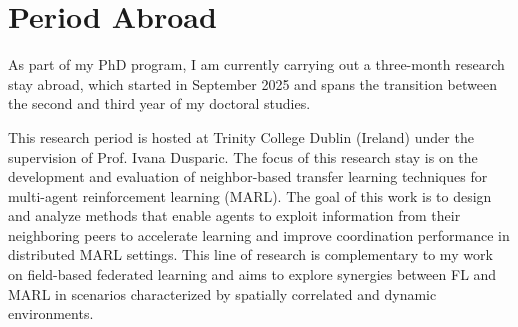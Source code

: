 \documentclass[runningheads]{llncs}
\begin{document}




\section{Period Abroad}
As part of my PhD program, I am currently carrying out a three-month research stay abroad, 
 which started in September 2025 and spans the transition between 
 the second and third year of my doctoral studies.

This research period is hosted at Trinity College Dublin (Ireland) 
 under the supervision of Prof. Ivana Dusparic. 
% 
The focus of this research stay is on the development and evaluation of neighbor-based transfer 
 learning techniques for multi-agent reinforcement learning (MARL).
%
The goal of this work is to design and analyze methods that enable agents to exploit information 
 from their neighboring peers to accelerate learning and improve coordination performance 
 in distributed MARL settings. 
% 
This line of research is complementary to my work on field-based federated learning and aims 
 to explore synergies between FL and MARL in scenarios characterized by spatially correlated and dynamic environments.
\end{document}
